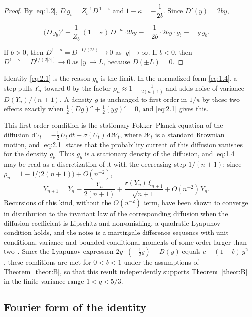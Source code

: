 \documentclass[aip,jmp,preprint,onecolumn,floatfix,superscriptaddress,nofootinbib,11pt]{revtex4-2}
\theoremstyle{plain}
\theoremstyle{remark}
\numberwithin{equation}{section}
\newcommand{\dd}{\mathrm{d}}
\begin{document}
\begin{proof} By \eqref{eq:1.2}, $D\,g_b=Z_b^{-1}D^{\,1-\kappa}$ and $1-\kappa=-\dfrac{1}{2b}$. Since $D'(y)=2by$,
 
\begin{equation*}
\big(D\,g_b\big)'=\frac{1}{Z_b}\,(1-\kappa)\,D^{-\kappa}\cdot 2by=-\frac{1}{2b}\cdot 2by\cdot g_b=-\,y\,g_b .
\end{equation*}
 
If $b>0$, then $D^{1-\kappa}=D^{-1/(2b)}\to0$ as $|y|\to\infty$. If $b<0$, then $D^{1-\kappa}=D^{1/(2|b|)}\to0$ as $|y|\to L$, because $D(\pm L)=0$. 
\end{proof}
 
Identity \eqref{eq:2.1} is the reason $g_b$ is the limit. In the normalized form \eqref{eq:1.4}, a step pulls $Y_n$ toward $0$ by the factor $\rho_n\approx1-\tfrac{1}{2(n+1)}$ and adds noise of variance $D(Y_n)/(n+1)$. A density $g$ is unchanged to first order in $1/n$ by these two effects exactly when $\tfrac12(Dg)''+\tfrac12(yg)'=0$, and \eqref{eq:2.1} gives this.
 
This first-order condition is the stationary Fokker--Planck equation of the diffusion $\dd U_t=-\tfrac12\,U_t\,\dd t+\sigma(U_t)\,\dd\mathcal W_t$, where $\mathcal W_t$ is a standard Brownian motion, and \eqref{eq:2.1} states that the probability current of this diffusion vanishes for the density $g_b$. Thus $g_b$ is a stationary density of the diffusion, and \eqref{eq:1.4} may be read as a discretization of it with the decreasing step $1/(n+1)$: since $\rho_n=1-1/\big(2(n+1)\big)+O(n^{-2})$,
%
\begin{equation*}
Y_{n+1}=Y_n-\frac{Y_n}{2(n+1)}+\frac{\sigma(Y_n)\,\xi_{n+1}}{\sqrt{n+1}}+O(n^{-2})\,Y_n .
\end{equation*}
%
Recursions of this kind, without the $O(n^{-2})$ term, have been shown to converge in distribution to the invariant law of the corresponding diffusion when the diffusion coefficient is Lipschitz and nonvanishing, a quadratic Lyapunov condition holds, and the noise is a martingale difference sequence with unit conditional variance and bounded conditional moments of some order larger than two~\cite{BHW}. Since the Lyapunov expression $2y\cdot(-\tfrac12y)+D(y)$ equals $c-(1-b)\,y^{2}$, these conditions are met for $0<b<1$ under the assumptions of Theorem~\ref{theor:B}, so that this result independently supports Theorem~\ref{theor:B} in the finite-variance range $1<q<5/3$.
 
\subsection{Fourier form of the identity}\label{sec:2_4}
 
\end{document}
